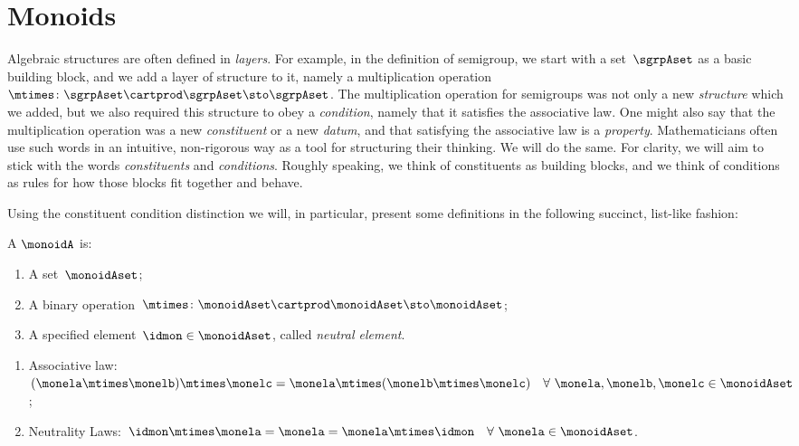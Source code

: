 
\section{Monoids}
\label{sec:parallelism-monoids}

Algebraic structures are often defined in \emph{layers}.
For example, in the definition of semigroup, we start with a set~$\sgrpAset$ as a basic building block, and we add a layer of structure to it, namely a multiplication operation~$\mtimes \colon \sgrpAset \cartprod \sgrpAset \sto \sgrpAset$.
The multiplication operation for semigroups was not only a new \emph{structure} which we added, but we also required this structure to obey a \emph{condition}, namely that it satisfies the associative law.
One might also say that the multiplication operation was a new \emph{constituent} or a new \emph{datum}, and that satisfying the associative law is a \emph{property}.
Mathematicians often use such words in an intuitive, non-rigorous way as a tool for structuring their thinking.
We will do the same.
For clarity, we will aim to stick with the words \emph{constituents} and \emph{conditions}.
Roughly speaking, we think of constituents as building blocks, and we think of conditions as rules for how those blocks fit together and behave.

Using the constituent \vs condition distinction we will, in particular, present some definitions in the following succinct, list-like fashion:

\begin{ctdefinition}[Monoid]
	\label{def:monoid}
	A \emph{}  $\monoidA$  is:
	\begin{body}
		\constit
		\begin{enumerate}
			\item A set~$\monoidAset$;
			\item A binary operation~$\mtimes  \colon \monoidAset \cartprod \monoidAset \sto \monoidAset$;
			\item A specified element~$\idmon \in \monoidAset$, called \emph{neutral element}.
		\end{enumerate}
		\condit
		\begin{enumerate}
			\item Associative law:~$(\monela\mtimes  \monelb)\mtimes  \monelc=
				      \monela\mtimes  (\monelb\mtimes  \monelc) \quad  \forall \  \monela, \monelb, \monelc \in \monoidAset$;
			\item Neutrality Laws:~$\idmon\mtimes \monela=\monela=\monela\mtimes  \idmon \quad  \forall \ \monela \in \monoidAset $.
		\end{enumerate}
	\end{body}
\end{ctdefinition}

